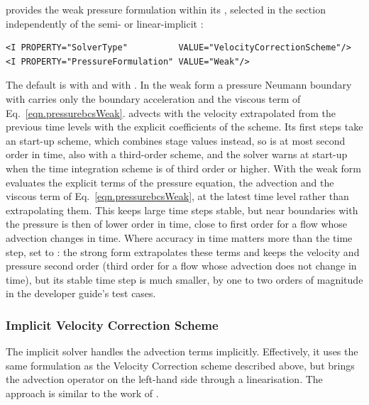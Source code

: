  provides the weak pressure formulation
within its , selected in the
 section independently of the semi- or linear-implicit
:
\begin{lstlisting}[style=XMLStyle]
<I PROPERTY="SolverType"          VALUE="VelocityCorrectionScheme"/>
<I PROPERTY="PressureFormulation" VALUE="Weak"/>
\end{lstlisting}
The default is  with 
 and  with . In the
weak form a pressure Neumann boundary
with  carries only the boundary acceleration and
the viscous term of Eq.~\eqref{eqn.pressurebcsWeak}.
 advects with the velocity extrapolated from the
previous time levels with the explicit coefficients of the 
scheme. Its first steps take an  start-up scheme, which
combines stage values instead, so  is at most second
order in time, also with a third-order  scheme, and the solver
warns at start-up when the time integration scheme is of third order or
higher. With  the weak form evaluates the explicit
terms of the pressure equation, the advection and the viscous term of
Eq.~\eqref{eqn.pressurebcsWeak}, at the latest time level rather than
extrapolating them. This keeps large time steps stable, but near boundaries
with  the pressure is then of lower order in
time, close to first order for a flow whose advection changes in time.
Where accuracy in time matters more than the time step, set
 to : the strong form extrapolates
these terms and keeps the velocity and pressure second order (third order
for a flow whose advection does not change in time), but its stable time
step is much smaller, by one to two orders of magnitude in the developer
guide's test cases.

\subsubsection{Implicit Velocity Correction Scheme}
\label{VCSImplicitScheme}

The implicit solver handles the advection terms implicitly. 
Effectively, it uses the same formulation
as the Velocity Correction scheme described above, but brings the advection
operator on the left-hand side through a linearisation. 
The approach is similar to the work of \cite{Simo1994,Dong2010}.

